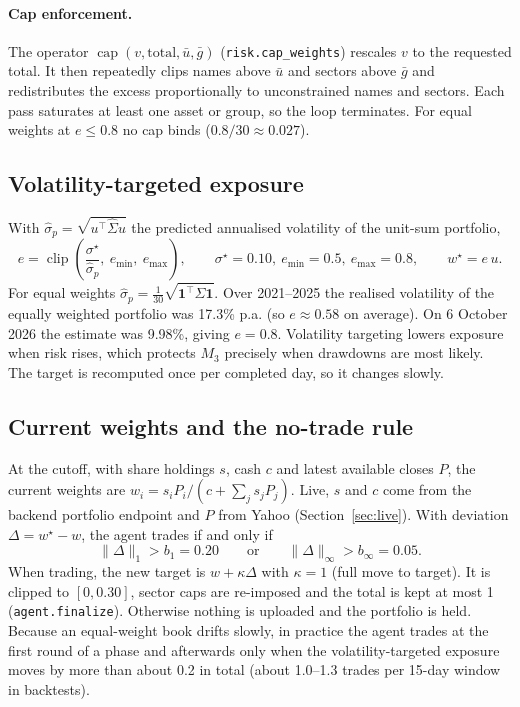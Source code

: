 \documentclass[11pt,a4paper]{article}
\newcommand{\code}[1]{\texttt{#1}}
\DeclareMathOperator{\clip}{clip}
\begin{document}
\paragraph{Cap enforcement.} The operator $\operatorname{cap}(v,\text{total},\bar u,\bar g)$ (\code{risk.cap\_weights})
rescales $v$ to the requested total. It then repeatedly clips names above $\bar u$ and sectors above $\bar g$ and
redistributes the excess proportionally to unconstrained names and sectors. Each pass saturates at least one asset or
group, so the loop terminates. For equal weights at $e\le0.8$ no cap binds ($0.8/30\approx0.027$).

\subsection{Volatility-targeted exposure}
With $\hat\sigma_p=\sqrt{u^\top\hat\Sigma u}$ the predicted annualised volatility of the unit-sum portfolio,
\begin{equation}
  e=\clip\!\left(\frac{\sigma^\star}{\hat\sigma_p},\ e_{\min},\ e_{\max}\right),\qquad
  \sigma^\star=0.10,\ e_{\min}=0.5,\ e_{\max}=0.8,\qquad w^\star=e\,u .
\end{equation}
For equal weights $\hat\sigma_p=\tfrac1{30}\sqrt{\mathbf 1^\top\hat\Sigma\mathbf 1}$. Over 2021--2025 the realised
volatility of the equally weighted portfolio was 17.3\% p.a. (so $e\approx0.58$ on average). On 6 October 2026 the
estimate was 9.98\%, giving $e=0.8$. Volatility targeting lowers exposure when risk rises, which protects $M_3$ precisely
when drawdowns are most likely. The target is recomputed once per completed day, so it changes slowly.

\subsection{Current weights and the no-trade rule}
At the cutoff, with share holdings $s$, cash $c$ and latest available closes $P$, the current weights are
$w_i=s_iP_i/(c+\sum_j s_jP_j)$. Live, $s$ and $c$ come from the backend portfolio endpoint and $P$ from Yahoo
(Section~\ref{sec:live}). With deviation $\Delta=w^\star-w$, the agent trades if and only if
\begin{equation}
  \|\Delta\|_1>b_1=0.20\qquad\text{or}\qquad\|\Delta\|_\infty>b_\infty=0.05 .
\end{equation}
When trading, the new target is $w+\kappa\Delta$ with $\kappa=1$ (full move to target). It is clipped to $[0,0.30]$,
sector caps are re-imposed and the total is kept at most 1 (\code{agent.finalize}). Otherwise nothing is uploaded and the
portfolio is held. Because an equal-weight book drifts slowly, in practice the agent trades at the first round of a
phase and afterwards only when the volatility-targeted exposure moves by more than about 0.2 in total
(about 1.0--1.3 trades per 15-day window in backtests).
\end{document}
